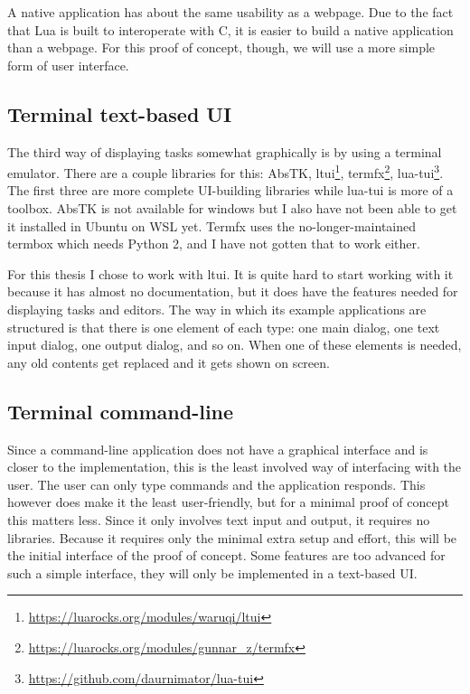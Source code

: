 A native application has about the same usability as a webpage. Due to the fact that Lua is built to interoperate with C, it is easier to build a native application than a webpage. For this proof of concept, though, we will use a more simple form of user interface.

\subsection{Terminal text-based UI}
The third way of displaying tasks somewhat graphically is by using a terminal emulator. There are a couple libraries for this:
AbsTK,
ltui\footnote{\url{https://luarocks.org/modules/waruqi/ltui}},
termfx\footnote{\url{https://luarocks.org/modules/gunnar_z/termfx}},
lua-tui\footnote{\url{https://github.com/daurnimator/lua-tui}}. The first three are more complete UI-building libraries while lua-tui is more of a toolbox. AbsTK is not available for windows but I also have not been able to get it installed in Ubuntu on WSL yet. Termfx uses the no-longer-maintained termbox which needs Python 2, and I have not gotten that to work either.

For this thesis I chose to work with ltui. It is quite hard to start working with it because it has almost no documentation, but it does have the features needed for displaying tasks and editors. The way in which its example applications are structured is that there is one element of each type: one main dialog, one text input dialog, one output dialog, and so on. When one of these elements is needed, any old contents get replaced and it gets shown on screen.

\subsection{Terminal command-line}
Since a command-line application does not have a graphical interface and is closer to the implementation, this is the least involved way of interfacing with the user. The user can only type commands and the application responds. This however does make it the least user-friendly, but for a minimal proof of concept this matters less. Since it only involves text input and output, it requires no libraries. Because it requires only the minimal extra setup and effort, this will be the initial interface of the proof of concept. Some features are too advanced for such a simple interface, they will only be implemented in a text-based UI.
